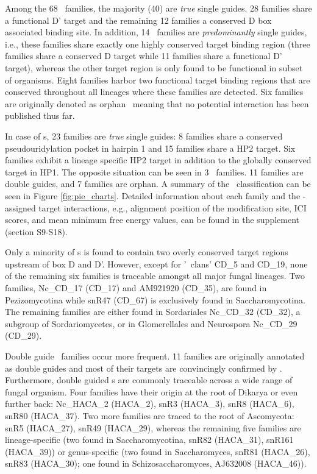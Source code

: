 Among the 68 \cd\ families, the majority (40) are \textit{true} single
guides.  28 families share a functional D' target and the remaining 12
families a conserved D box associated binding site.   In addition, 14 \cd\ families are
\textit{predominantly} single guides, i.e., these families share exactly
one highly conserved target binding region (three families share a
conserved D target while 11 families share a functional D' target), whereas
the other target region is only found to be functional in subset of
organisms. Eight families harbor two functional target binding regions that
are conserved throughout all lineages where these families are detected.
Six families are originally denoted as orphan \sno\ meaning that no
potential interaction has been published thus far.

In case of \haca s, 23 families are \textit{true} single guides: 8 families
share a conserved pseudouridylation pocket in hairpin 1 and 15 families
share a HP2 target. Six families exhibit a lineage specific HP2 target in
addition to the globally conserved target in HP1. The opposite situation
can be seen in 3 \haca\ families. 11 families are double guides, and 7
families are orphan. A summary of the \sno\ classification can be seen in
Figure \ref{fig:pie_charts}.  Detailed information about each family and
the \snostrip-assigned target interactions, e.g., alignment position of the
modification site, ICI scores, and mean minimum free energy values, can be
found in the supplement (section S9-S18).


Only a minority of \cd s is found to contain two overly conserved
target regions upstream of box D and D'. However, except for '\sno\
clans' CD\_5 and CD\_19, none of the remaining six families is
traceable amongst all major fungal lineages. Two families, Nc\_CD\_17
(CD\_17) and AM921920 (CD\_35), are found in Pezizomycotina while
snR47 (CD\_67) is exclusively found in Saccharomycotina. The remaining
families are either found in Sordariales Nc\_CD\_32 (CD\_32), a
subgroup of Sordariomycetes, or in Glomerellales and Neurospora
Nc\_CD\_29 (CD\_29).

Double guide \haca\ families occur more frequent. 11 families are
originally annotated as double guides and most of their targets are
convincingly confirmed by \snostrip. Furthermore, double guided \haca
s are commonly traceable across a wide range of fungal organism. Four
families have their origin at the root of Dikarya or even further
back: Nc\_HACA\_2 (HACA\_2), snR3 (HACA\_3), snR8 (HACA\_6), snR80
(HACA\_37). Two more families are traced to the root of Ascomycota:
snR5 (HACA\_27), snR49 (HACA\_29), whereas the remaining five families
are lineage-specific (two found in Saccharomycotina, snR82 (HACA\_31),
snR161 (HACA\_39)) or genus-specific (two found in Saccharomyces,
snR81 (HACA\_26), snR83 (HACA\_30); one found in Schizosaccharomyces,
AJ632008 (HACA\_46)).

